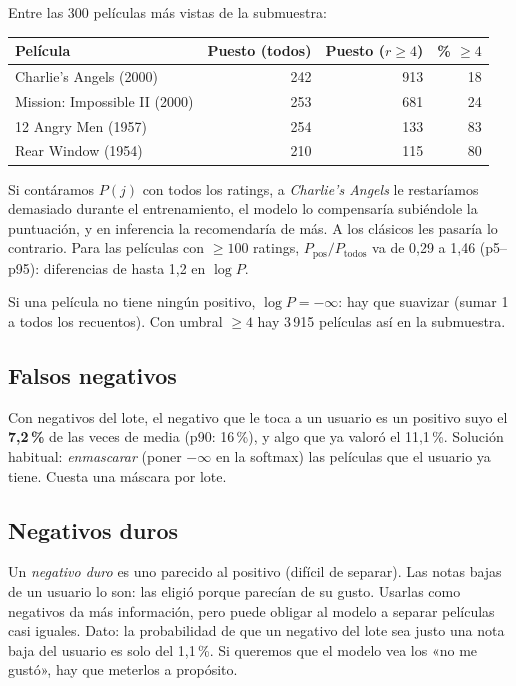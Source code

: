 \documentclass[a4paper,11pt]{article}
\begin{document}
\begin{ejemplo}
Entre las 300 películas más vistas de la submuestra:
\begin{center}
\begin{tabular}{lrrr}
\toprule
Película & Puesto (todos) & Puesto ($r\ge4$) & \% $\ge4$ \\
\midrule
Charlie's Angels (2000) & 242 & 913 & 18 \\
Mission: Impossible II (2000) & 253 & 681 & 24 \\
12 Angry Men (1957) & 254 & 133 & 83 \\
Rear Window (1954) & 210 & 115 & 80 \\
\bottomrule
\end{tabular}
\end{center}
Si contáramos $P(j)$ con todos los ratings, a \emph{Charlie's Angels} le restaríamos demasiado durante el
entrenamiento, el modelo lo compensaría subiéndole la puntuación, y en inferencia la recomendaría de más. A los
clásicos les pasaría lo contrario. Para las películas con $\ge 100$ ratings, $P_\text{pos}/P_\text{todos}$ va de 0,29 a
1,46 (p5--p95): diferencias de hasta 1,2 en $\log P$.
\end{ejemplo}

Si una película no tiene ningún positivo, $\log P = -\infty$: hay que suavizar (sumar 1 a todos los recuentos). Con
umbral $\ge 4$ hay 3\,915 películas así en la submuestra.

\subsection{Falsos negativos}\label{sec:falsos}
Con negativos del lote, el negativo que le toca a un usuario es un positivo suyo el \textbf{7,2\,\%} de las veces de
media (p90: 16\,\%), y algo que ya valoró el 11,1\,\%. Solución habitual: \emph{enmascarar} (poner $-\infty$ en la
softmax) las películas que el usuario ya tiene. Cuesta una máscara por lote.

\subsection{Negativos duros}
Un \emph{negativo duro} es uno parecido al positivo (difícil de separar). Las notas bajas de un usuario lo son: las
eligió porque parecían de su gusto. Usarlas como negativos da más información, pero puede obligar al modelo a separar
películas casi iguales. Dato: la probabilidad de que un negativo del lote sea justo una nota baja del usuario es solo
del 1,1\,\%. Si queremos que el modelo vea los «no me gustó», hay que meterlos a propósito.
\end{document}

